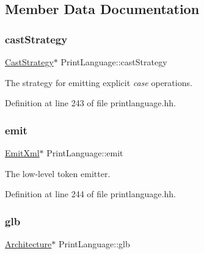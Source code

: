 \subsection{Member Data Documentation}
\mbox{\label{class_print_language_abb49ca98bdc4f3d655362031987ab6db}} 
\subsubsection{\texorpdfstring{castStrategy}{castStrategy}}
{\footnotesize\ttfamily \mbox{\hyperlink{class_cast_strategy}{Cast\+Strategy}}$\ast$ Print\+Language\+::cast\+Strategy\hspace{0.3cm}{\ttfamily [protected]}}



The strategy for emitting explicit {\itshape case} operations. 



Definition at line 243 of file printlanguage.\+hh.

\mbox{\label{class_print_language_a448d008089a47944ef6b07b4892faa7f}} 
\subsubsection{\texorpdfstring{emit}{emit}}
{\footnotesize\ttfamily \mbox{\hyperlink{class_emit_xml}{Emit\+Xml}}$\ast$ Print\+Language\+::emit\hspace{0.3cm}{\ttfamily [protected]}}



The low-\/level token emitter. 



Definition at line 244 of file printlanguage.\+hh.

\mbox{\label{class_print_language_a0100461bfbb13d149ce623cb0a82e99f}} 
\subsubsection{\texorpdfstring{glb}{glb}}
{\footnotesize\ttfamily \mbox{\hyperlink{class_architecture}{Architecture}}$\ast$ Print\+Language\+::glb\hspace{0.3cm}{\ttfamily [protected]}}



